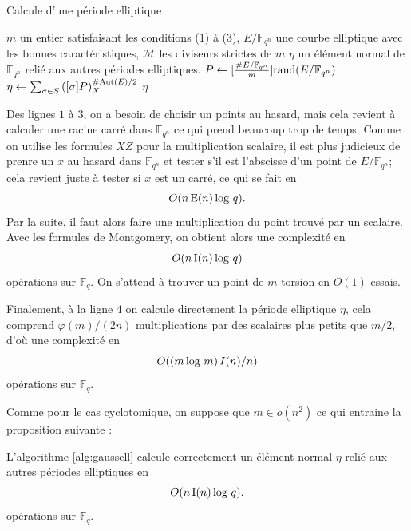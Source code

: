 \documentclass[a4paper]{article} %
\numberwithin{section}{part}
\numberwithin{equation}{section}
\newcommand\GF[1]{\mathbb{F}_{#1}}
\newcommand\EO{\mathcal{O}}
\newcommand\E[1]{\textup{E}(#1)}
\newcommand\I[1]{\textup{I}(#1)}
\begin{document}
\begin{algorithm}
\caption{Calcule d'une période elliptique}
\label{alg:gaussell}
\begin{algorithmic}[1]
\REQUIRE $m$ un entier satisfaisant les conditions (1) à (3), $E/\GF{q^n}$ une 
courbe elliptique avec les bonnes caractéristiques, $\mathcal{M}$ les diviseurs
strictes de $m$
\ENSURE $\eta$ un élément normal de $\GF{q^n}$ relié aux autres périodes
elliptiques.
\bigskip
\REPEAT
    \STATE $P \leftarrow [\frac{\#E/\GF{q^n}}{m}]\textup{rand}(E/\GF{q^n})$
\UNTIL{$[m]P = \EO\quad\&\quad[d]P\neq\EO\quad\forall d\in\mathcal{M}$}
\STATE $\eta \leftarrow \sum_{\sigma\in
S}{\left([\sigma]P\right)_X^{\#\textup{Aut}(E)/2}}$
\RETURN $\eta$
\end{algorithmic}
\end{algorithm}

Des lignes $1$ à $3$, on a besoin de choisir un points au hasard, mais cela 
revient à calculer une racine carré dans $\GF{q^n}$ ce qui prend beaucoup trop
de temps. Comme on utilise les formules $XZ$ pour la
multiplication scalaire, il est plus judicieux de prenre un $x$ au hasard dans 
$\GF{q^n}$ et tester s'il est l'abscisse d'un point de $E/\GF{q^n}$; cela 
revient juste à tester si $x$ est un carré, ce qui se fait en 
\begin{equation}
O(n\,\E{n}\,\textup{log }q).
\end{equation}
Par la suite, il faut alors faire une multiplication
du point trouvé par un scalaire. Avec les formules de Montgomery, on obtient
alors une complexité en 
\begin{equation}
O(n\,\I{n}\,\textup{log }q)
\end{equation}
opérations sur $\GF{q}$. On s'attend à trouver un point de $m$-torsion en $O(1)$
essais.\par
Finalement, à la ligne $4$ on calcule directement la période elliptique $\eta$,
cela comprend $\varphi(m)/(2n)$ multiplications par des scalaires plus petits
que $m/2$, d'où une complexité en 
\begin{equation}
O((m\,\textup{log }m)\,I(n)/n)
\end{equation}
opérations sur $\GF{q}$.\par
Comme pour le cas cyclotomique, on suppose que $m\in o(n^2)$ ce qui entraine la
proposition suivante :


\begin{prop}
L'algorithme \ref{alg:gaussell} calcule correctement un élément normal $\eta$ 
relié aux autres périodes elliptiques en
\begin{equation}
O(n\,\I{n}\,\textup{log }q).
\end{equation}
opérations sur $\GF{q}$.
\end{prop}
\newpage
\end{document}
